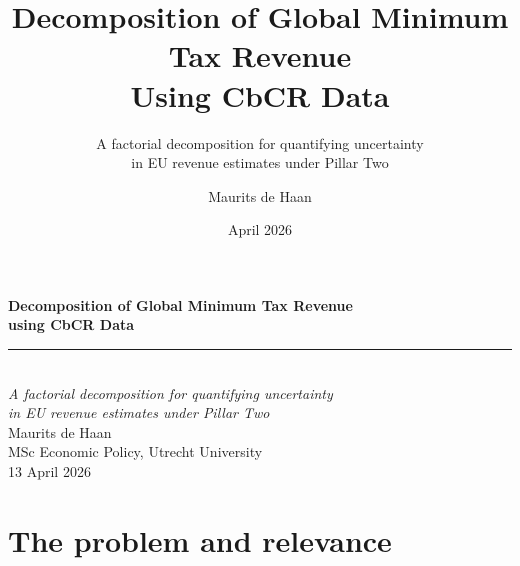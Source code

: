 \documentclass[aspectratio=169, 11pt]{beamer}
\title{Decomposition of Global Minimum Tax Revenue\\Using CbCR Data}
\subtitle{A factorial decomposition for quantifying uncertainty\\in EU revenue estimates under Pillar Two}
\author{Maurits de Haan}
\institute{MSc Economic Policy\\ Utrecht University School of Economics}
\date{April 2026}
\begin{document}
{
\begin{frame}[plain]
  \vspace{1.8em}
  \begin{center}
    {\color{Ivory}\Large\bfseries Decomposition of Global Minimum Tax Revenue}\\[0.3em]
    {\color{Ivory}\Large\bfseries using CbCR Data}\\[0.8em]
    {\color{DkOrange}\rule{6cm}{2pt}}\\[0.8em]
    {\color{LtOrange}\normalsize\itshape A factorial decomposition for quantifying uncertainty\\[0.2em]
     in EU revenue estimates under Pillar Two}\\[1.8em]
    {\color{Ivory}\normalsize Maurits de Haan}\\[0.3em]
    {\color{WarmGrey}\small MSc Economic Policy, Utrecht University}\\[0.3em]
    {\color{MidGrey}\small 13 April 2026}
  \end{center}
\end{frame}
}

\section{The problem and relevance}
\end{document}
